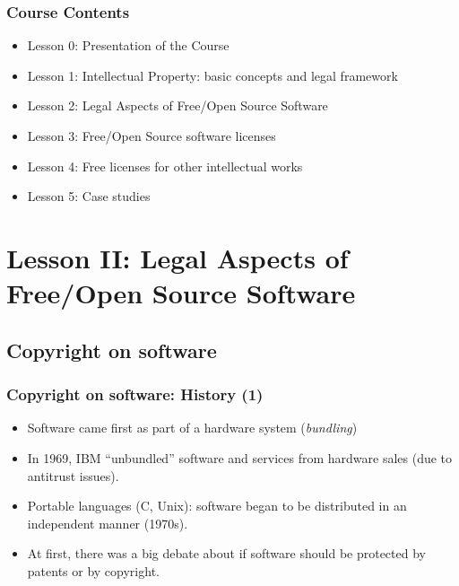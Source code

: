 
\begin{frame}
  \frametitle{Course Contents}

  \begin{itemize}
    \item Lesson 0: Presentation of the Course
    \item Lesson 1: Intellectual Property: basic concepts and legal framework
    \item \alert{Lesson 2: Legal Aspects of Free/Open Source Software}
    \item Lesson 3: Free/Open Source software licenses
    \item Lesson 4: Free licenses for other intellectual works
    \item Lesson 5: Case studies
  \end{itemize}

\end{frame}



\section{Lesson II: Legal Aspects of Free/Open Source Software}

\subsection{Copyright on software}

\begin{frame}
\frametitle{Copyright on software: History (1)}

\begin{itemize}
\item Software came first as part of a hardware system (\emph{bundling})
\item In 1969, IBM ``unbundled'' software and services from hardware sales (due to antitrust issues).
\item Portable languages (C, Unix): software began to be distributed in an independent manner (1970s).
\item At first, there was a big debate about if software should be protected
by patents or by copyright.
\end{itemize}

\end{frame}


